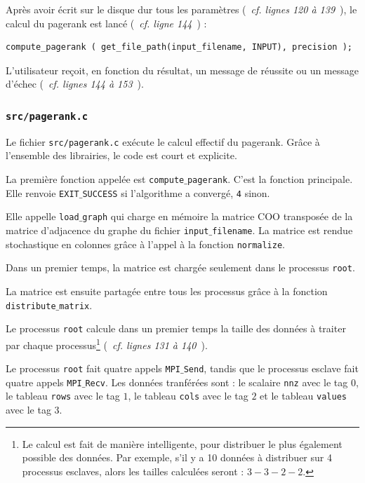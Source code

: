 \documentclass[a4paper,12pt]{article}
\begin{document}
\bigskip

Après avoir écrit sur le disque dur tous les paramètres (~\textit{cf. lignes 120 à 139}~), le calcul du pagerank est lancé (~\textit{cf. ligne 144}~) :

\begin{lstlisting}
compute_pagerank ( get_file_path(input_filename, INPUT), precision );
\end{lstlisting}

\medskip

L'utilisateur reçoit, en fonction du résultat, un message de réussite ou un message d'échec (~\textit{cf. lignes 144 à 153}~).

\vspace{2cm}

\subsubsection{\texttt{src/pagerank.c}}

Le fichier \texttt{src/pagerank.c} exécute le calcul effectif du pagerank. Grâce à l'ensemble des librairies, le code est court et explicite.

\bigskip

La première fonction appelée est \texttt{compute$\_$pagerank}. C'est la fonction principale. Elle renvoie \texttt{EXIT$\_$\-SUCCESS} si l'algorithme a convergé, \texttt{4} sinon.

\bigskip

Elle appelle \texttt{load$\_$graph} qui charge en mémoire la matrice COO transposée de la matrice d'adjacence du graphe du fichier \texttt{input$\_$filename}. 
La matrice est rendue stochastique en colonnes grâce à l'appel à la fonction \texttt{normalize}.

Dans un premier temps, la matrice est chargée seulement dans le processus \texttt{root}.

\bigskip

La matrice est ensuite partagée entre tous les processus grâce à la fonction \texttt{distri\-bute$\_$matrix}. 

Le processus \texttt{root} calcule dans un premier temps la taille des données à traiter par chaque processus\footnote{Le calcul est fait de manière intelligente, pour distribuer le plus également possible des données. Par exemple, s'il y a 10 données à distribuer sur 4 processus esclaves, alors les tailles calculées seront : $3 - 3 - 2 - 2$.} (~\textit{cf. lignes 131 à 140}~).

Le processus \texttt{root} fait quatre appels \texttt{MPI$\_$Send}, tandis que le processus esclave fait quatre appels \texttt{MPI$\_$Recv}. Les données tranférées sont : le scalaire \texttt{nnz} avec le tag $0$, le tableau \texttt{rows} avec le tag $1$, le tableau \texttt{cols} avec le tag $2$ et le tableau \texttt{values} avec le tag $3$.
\end{document}
